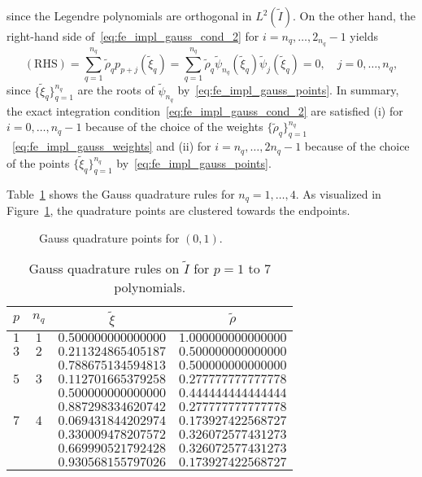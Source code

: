 since the Legendre polynomials are orthogonal in $L^2(\tilde I)$. On the other hand, the right-hand side of~\ref{eq:fe_impl_gauss_cond_2} for $i = n_q,\dots,2_{n_q}-1$ yields
\begin{equation*}
  (\text{RHS})
  = \sum_{q=1}^{n_q} \tilde \rho_q p_{p+j}(\tilde \xi_q)
  = \sum_{q=1}^{n_q} \tilde \rho_q \tilde \psi_{n_q}(\tilde \xi_q) \tilde \psi_{j}(\tilde \xi_q)
  = 0, \quad j = 0,\dots,n_q,
\end{equation*}
since $\{\tilde \xi_q\}_{q=1}^{n_q}$ are the roots of $\tilde \psi_{n_q}$ by~\eqref{eq:fe_impl_gauss_points}. In summary, the exact integration condition~\ref{eq:fe_impl_gauss_cond_2} are satisfied (i) for $i = 0,\dots,n_q-1$ because of the choice of the weights $\{\tilde \rho_q\}_{q=1}^{n_q}$ ~\eqref{eq:fe_impl_gauss_weights} and (ii) for $i = n_q, \dots, 2 n_q-1$ because of the choice of the points $\{\tilde \xi_q\}_{q=1}^{n_q}$ by~\eqref{eq:fe_impl_gauss_points}.

Table~\ref{tb:fe_impl_gauss} shows the Gauss quadrature rules for $n_q = 1,\dots,4$.  As visualized in Figure~\ref{fig:fe_impl_gauss_points}, the quadrature points are clustered towards the endpoints.
\begin{figure}
  \centering
  \caption{Gauss quadrature points for $(0,1)$. \label{fig:fe_impl_gauss_points}}
\end{figure}

\begin{table}
  \centering
  \begin{tabular}{cccc}
    $p$ & $n_q$ & $\tilde \xi$ & $\tilde \rho$ \\
    \hline
    $1$ & $1$ & $0.500000000000000$ & $1.000000000000000$ \\
    \hline
    $3$ & $2$ & $0.211324865405187$ & $0.500000000000000$ \\ 
    & & $0.788675134594813$ & $0.500000000000000$ \\
    \hline
    $5$ & $3$ & $0.112701665379258$ & $0.277777777777778$ \\ 
     & & $0.500000000000000$ & $0.444444444444444$ \\ 
     & & $0.887298334620742$ & $0.277777777777778$ \\
    \hline
    $7$ & $4$ & $0.069431844202974$ & $0.173927422568727$ \\ 
    & & $0.330009478207572$ & $0.326072577431273$ \\ 
    & & $0.669990521792428$ & $0.326072577431273$ \\ 
    & & $0.930568155797026$ & $0.173927422568727$ 
  \end{tabular}
  \caption{Gauss quadrature rules on $\tilde I$ for $p = 1$ to $7$ polynomials. \label{tb:fe_impl_gauss}}
\end{table}

